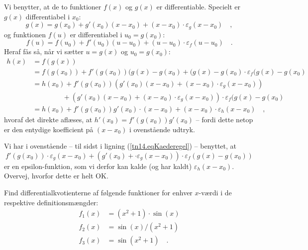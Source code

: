 \begin{bevis}
Vi benytter, at de to funktioner  $f(x)$ og $g(x)$ er differentiable. Specielt er $g(x)$ differentiabel i $x_{0}$:
\begin{equation}
g(x) = g(x_{0}) + g'(x_{0})(x - x_{0}) + (x-x_{0})\cdot \varepsilon_{g}(x - x_{0}) \quad ,
\end{equation}
og funktionen $f(u)$ er differentiabel i $u_{0} = g(x_{0})$:
\begin{equation}
f(u) = f(u_{0}) + f'(u_{0})(u - u_{0}) + (u - u_{0})\cdot\varepsilon_{f}(u - u_{0}) \quad.
\end{equation}
Heraf fås så, når vi sætter $u = g(x)$ og $u_{0} = g(x_{0})$:
\begin{equation}\label{tn14.eqKaederegel}
\begin{aligned}
h(x) &= f(g(x)) \\
&= f(g(x_{0})) + f'(g(x_{0}))(g(x) - g(x_{0}) + (g(x) - g(x_{0}) \cdot \varepsilon_{f}(g(x) - g(x_{0})\\
&= h(x_{0}) + f'(g(x_{0}))(g'(x_{0})(x - x_{0}) + (x-x_{0})\cdot \varepsilon_{g}(x - x_{0})) \\
&\phantom{\quad h(x_{0})} + (g'(x_{0})(x - x_{0}) + (x-x_{0})\cdot \varepsilon_{g}(x - x_{0}))\cdot \varepsilon_{f}(g(x) - g(x_{0})\\
&= h(x_{0}) + f'(g(x_{0}))g'(x_{0})\cdot(x - x_{0}) + (x- x_{0}) \cdot \varepsilon_{h}(x - x_{0}) \quad,
\end{aligned}
\end{equation}
hvoraf det direkte aflæses, at $h'(x_{0}) = f'(g(x_{0}))g'(x_{0})$ -- fordi dette netop er den entydige koefficient på $(x - x_{0})$ i ovenstående udtryk.
\end{bevis}

\begin{exercise}
Vi har i ovenstående -- til sidst i ligning (\ref{tn14.eqKaederegel}) -- benyttet, at
\begin{equation}
f'(g(x_{0}))\cdot \varepsilon_{g}(x - x_{0}) + (g'(x_{0}) + \cdot \varepsilon_{g}(x - x_{0}))\cdot \varepsilon_{f}(g(x) - g(x_{0}))
\end{equation}
er en epsilon-funktion, som vi derfor kan kalde (og har kaldt) $\varepsilon_{h}(x - x_{0})$.
Overvej, hvorfor dette er helt OK.
\end{exercise}

\begin{exercise}
Find differentialkvotienterne af følgende funktioner for enhver $x$-værdi i de respektive definitionsmængder:
\begin{equation}
\begin{aligned}
f_{1}(x) &= (x^{2} + 1)\cdot\sin(x) \\
f_{2}(x) &= \sin(x)/(x^{2} + 1) \\
f_{3}(x) &= \sin(x^2 +1) \quad .
\end{aligned}
\end{equation}
\end{exercise}


